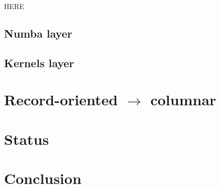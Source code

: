 \documentclass{webofc}
\begin{document}
HERE

\subsection{Numba layer}

\subsection{Kernels layer}

\section{Record-oriented $\to$ columnar}
\label{lab:fillablearray}


\section{Status}

\section{Conclusion}






\end{document}
